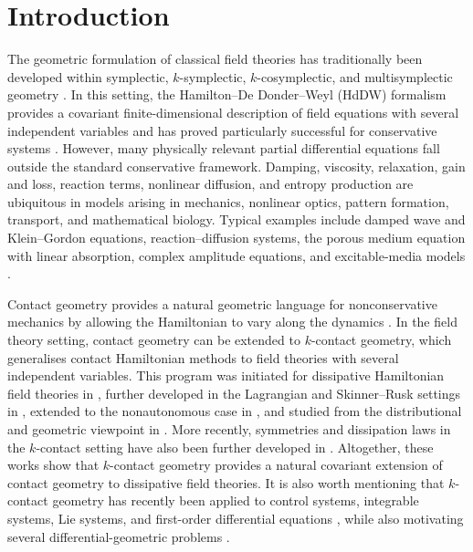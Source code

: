 \documentclass[11pt,a4paper]{article}
\theoremstyle{plain} \newtheorem{theorem}{Theorem}[section] \newtheorem{proposition}[theorem]{Proposition} \newtheorem{corollary}[theorem]{Corollary} \newtheorem{lemma}[theorem]{Lemma} \theoremstyle{definition} \newtheorem{definition}[theorem]{Definition} \theoremstyle{remark} \newtheorem{remark}[theorem]{Remark} \newtheorem{example}[theorem]{Example} %
\begin{document}

\section{Introduction}

The geometric formulation of classical field theories has traditionally been developed within symplectic, \(k\)-symplectic, \(k\)-cosymplectic, and multisymplectic geometry \cite{KT_79,LR_89,Arn_89}. In this setting, the Hamilton--De Donder--Weyl (HdDW) formalism provides a covariant finite-dimensional description of field equations with several independent variables and has proved particularly successful for conservative systems \cite{Gun_87,Kij_73,KT_79,Mer_97}. However, many physically relevant partial differential equations fall outside the standard conservative framework. Damping, viscosity, relaxation, gain and loss, reaction terms, nonlinear diffusion, and entropy production are ubiquitous in models arising in mechanics, nonlinear optics, pattern formation, transport, and mathematical biology. Typical examples include damped wave and Klein--Gordon equations, reaction--diffusion systems, the porous medium equation with linear absorption, complex amplitude equations, and excitable-media models \cite{AllenCahn1979,Vazquez2007,AransonKramer2002,Murray2002,Nagumo1962}.

Contact geometry provides a natural geometric language for nonconservative mechanics by allowing the Hamiltonian to vary along the dynamics \cite{Bra_17,BCT_17,LS_17}. In the field theory setting, contact geometry can be extended to \(k\)-contact geometry, which generalises contact Hamiltonian methods to field theories with several independent variables. This program was initiated for dissipative Hamiltonian field theories in \cite{GGMRR_20}, further developed in the Lagrangian and Skinner--Rusk settings in \cite{GGMRR_21,GRR_22}, extended to the nonautonomous case in \cite{Riv_23}, and studied from the distributional and geometric viewpoint in \cite{LRS_25}. More recently, symmetries and dissipation laws in the \(k\)-contact setting have also been further developed in \cite{RSS_24}. Altogether, these works show that \(k\)-contact geometry provides a natural covariant extension of contact geometry to dissipative field theories. It is also worth mentioning that \(k\)-contact geometry has recently been applied to control systems, integrable systems, Lie systems, and first-order differential equations \cite{SF_25,LRS_25,deLucasRivasSobczak2026}, while also motivating several differential-geometric problems \cite{LRS_25,Riv_22,SF_25}.
\end{document}

